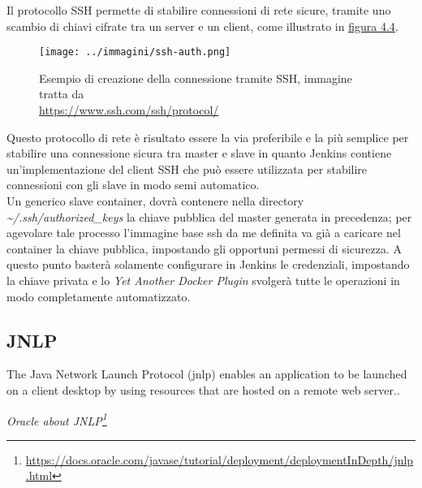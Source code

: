 Il protocollo SSH permette di stabilire connessioni di rete sicure, tramite uno scambio di chiavi cifrate tra un server e un client, come illustrato in \hyperref[fig:ssh-connection]{figura 4.4}.

\begin{figure}[H]
    \capstart
    \label{fig:ssh-connection}
    \captionsetup{justification=centering}
    \centering
    \texttt{[image: ../immagini/ssh-auth.png]}
    \caption[Esempio di creazione della connessione tramite SSH]{Esempio di creazione della connessione tramite SSH, immagine tratta da \\ \url{https://www.ssh.com/ssh/protocol/}}
\end{figure}

Questo protocollo di rete è risultato essere la via preferibile e la più semplice per stabilire una connessione sicura tra master e slave in quanto Jenkins contiene un'implementazione del client SSH che può essere utilizzata per stabilire connessioni con gli slave in modo semi automatico. \\
Un generico slave container\cite{site:dockerize-a-ssh-service}, dovrà contenere nella directory \textit{\textasciitilde/.ssh/authorized\_keys} la chiave pubblica del master generata in precedenza; per agevolare tale processo l'immagine base ssh da me definita va già a caricare nel container la chiave pubblica, impostando gli opportuni permessi di sicurezza. A questo punto basterà solamente configurare in Jenkins le credenziali, impostando la chiave privata e lo \textit{Yet Another Docker Plugin} svolgerà tutte le operazioni in modo completamente automatizzato.

\subsection{JNLP}
\label{subsec:jnlp}

\begin{shadequote}
    The Java Network Launch Protocol (\gls{jnlp}) enables an application to be launched on a client desktop by using resources that are hosted on a remote web server..\par\emph{Oracle about JNLP\footnote{\url{https://docs.oracle.com/javase/tutorial/deployment/deploymentInDepth/jnlp.html}}}
\end{shadequote}

